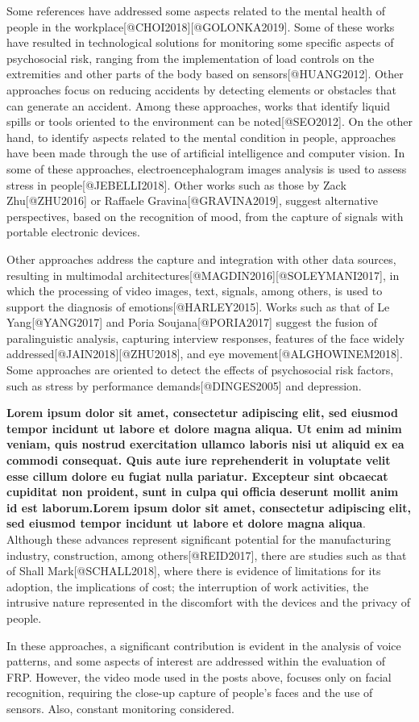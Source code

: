 \documentclass[]{article}
\begin{document}
Some references have addressed some aspects related to the mental health
of people in the workplace{[}@CHOI2018{]}{[}@GOLONKA2019{]}. Some of
these works have resulted in technological solutions for monitoring some
specific aspects of psychosocial risk, ranging from the implementation
of load controls on the extremities and other parts of the body based on
sensors{[}@HUANG2012{]}. Other approaches focus on reducing accidents by
detecting elements or obstacles that can generate an accident. Among
these approaches, works that identify liquid spills or tools oriented to
the environment can be noted{[}@SEO2012{]}. On the other hand, to
identify aspects related to the mental condition in people, approaches
have been made through the use of artificial intelligence and computer
vision. In some of these approaches, electroencephalogram images
analysis is used to assess stress in people{[}@JEBELLI2018{]}. Other
works such as those by Zack Zhu{[}@ZHU2016{]} or Raffaele
Gravina{[}@GRAVINA2019{]}, suggest alternative perspectives, based on
the recognition of mood, from the capture of signals with portable
electronic devices.

Other approaches address the capture and integration with other data
sources, resulting in multimodal
architectures{[}@MAGDIN2016{]}{[}@SOLEYMANI2017{]}, in which the
processing of video images, text, signals, among others, is used to
support the diagnosis of emotions{[}@HARLEY2015{]}. Works such as that
of Le Yang{[}@YANG2017{]} and Poria Soujana{[}@PORIA2017{]} suggest the
fusion of paralinguistic analysis, capturing interview responses,
features of the face widely addressed{[}@JAIN2018{]}{[}@ZHU2018{]}, and
eye movement{[}@ALGHOWINEM2018{]}. Some approaches are oriented to
detect the effects of psychosocial risk factors, such as stress by
performance demands{[}@DINGES2005{]} and depression.

\textbf{Lorem ipsum dolor sit amet, consectetur adipiscing elit, sed
eiusmod tempor incidunt ut labore et dolore magna aliqua. Ut enim ad
minim veniam, quis nostrud exercitation ullamco laboris nisi ut aliquid
ex ea commodi consequat. Quis aute iure reprehenderit in voluptate velit
esse cillum dolore eu fugiat nulla pariatur. Excepteur sint obcaecat
cupiditat non proident, sunt in culpa qui officia deserunt mollit anim
id est laborum.Lorem ipsum dolor sit amet, consectetur adipiscing elit,
sed eiusmod tempor incidunt ut labore et dolore magna aliqua}. Although
these advances represent significant potential for the manufacturing
industry, construction, among others{[}@REID2017{]}, there are studies
such as that of Shall Mark{[}@SCHALL2018{]}, where there is evidence of
limitations for its adoption, the implications of cost; the interruption
of work activities, the intrusive nature represented in the discomfort
with the devices and the privacy of people.

In these approaches, a significant contribution is evident in the
analysis of voice patterns, and some aspects of interest are addressed
within the evaluation of FRP. However, the video mode used in the posts
above, focuses only on facial recognition, requiring the close-up
capture of people's faces and the use of sensors. Also, constant
monitoring considered.
\end{document}
